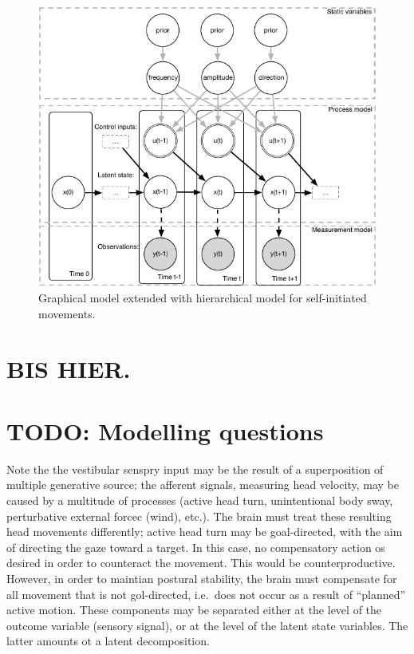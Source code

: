 \documentclass[english,floatsintext,man]{apa6}
\theoremstyle{definition}
\theoremstyle{definition}
\theoremstyle{remark}
\begin{document}
\begin{figure}
\centering
\includegraphics{diagrams/dynamic-belief-network-inference-2.pdf}
\caption{\label{fig:graphical-model-control}Graphical model extended with
hierarchical model for self-initiated movements.}
\end{figure}

\section{\texorpdfstring{\textbf{BIS
HIER.}}{BIS HIER.}}\label{bis-hier.}

\section{TODO: Modelling questions}\label{todo-modelling-questions}

Note the the vestibular senspry input may be the result of a
superposition of multiple generative source; the afferent signals,
measuring head velocity, may be caused by a multitude of processes
(active head turn, unintentional body sway, perturbative external forcec
(wind), etc.). The brain must treat these resulting head movements
differently; active head turn may be goal-directed, with the aim of
directing the gaze toward a target. In this case, no compensatory action
os desired in order to counteract the movement. This would be
counterproductive. However, in order to maintian postural stability, the
brain must compensate for all movement that is not gol-directed,
i.e.~does not occur as a result of \enquote{planned} active motion.
These components may be separated either at the level of the outcome
variable (sensory signal), or at the level of the latent state
variables. The latter amounts ot a latent decomposition.
\end{document}
